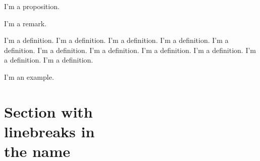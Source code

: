 \begin{proposition}
I'm a proposition.
\end{proposition}

\begin{remark}
I'm a remark. 
\end{remark}

\begin{definition}
I'm a definition. I'm a definition. I'm a definition. I'm a definition. I'm a definition. I'm a definition. I'm a definition. I'm a definition. I'm a definition. I'm a definition. I'm a definition. 
\end{definition}

\begin{example}
I'm an example.
\end{example}


\section[Optional table of contents heading]{Section with\\ linebreaks in\\the
name}


\Blindtext[2]




